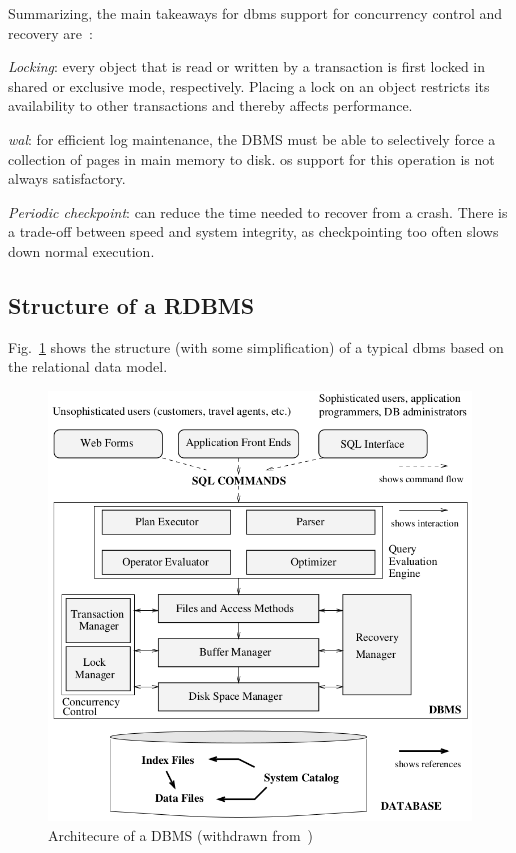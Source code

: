 Summarizing, the main takeaways for \gls{dbms} support for concurrency control
and recovery are~\cite{ramakrishnan2003database}:
\begin{item-c}
\item \emph{Locking}:
every object that is read or written by a transaction is first locked in shared
or exclusive mode, respectively. Placing a lock on an object restricts its
availability to other transactions and thereby affects performance.
\item \emph{\gls{wal}}: for efficient log maintenance, the DBMS must be able to
  selectively force a collection of pages in main memory to disk. \gls{os}
  support for this operation is not always satisfactory.
\item \emph{Periodic checkpoint}:
  can reduce the time needed to recover from a crash. There is a trade-off
  between speed and system integrity, as checkpointing too often slows
  down normal execution. 
\end{item-c}
%
\subsection{Structure of a RDBMS}
\label{sec:structure-rdbms}

Fig.~\ref{fig:dbms-abstraction-levels} shows the structure (with some
simplification) of a typical \gls{dbms} based on the relational data model.
%
\begin{figure}[htb!]
\centering
    \includegraphics[width=0.75\columnwidth]{./img/dbms-struct.png}
  \caption{Architecure of a DBMS (withdrawn from~\cite{ramakrishnan2003database})}%
\label{fig:dbms-abstraction-levels}
\end{figure}
%

